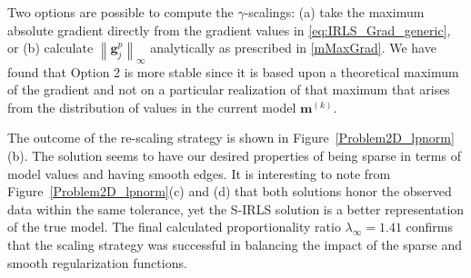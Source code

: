 \documentclass[extra,referee]{gji}
\begin{document}
Two options are possible to compute the $\gamma$-scalings: (a) take the maximum absolute gradient directly from the gradient values in \eqref{eq:IRLS_Grad_generic}, or (b) calculate $\left\|\mathbf{g}_j^p\right\|_\infty$ analytically as prescribed in \eqref{mMaxGrad}. We have found that Option 2 is more stable since it is based upon a theoretical maximum of the gradient and not on a particular realization of that maximum that arises from the distribution of values in the current model $\mathbf{m}^{(k)}$.

The outcome of the re-scaling strategy is shown in Figure~\ref{Problem2D_lpnorm}(b). The solution seems to have our desired properties of being sparse in terms of model values and having smooth edges. It is interesting to note from Figure~\ref{Problem2D_lpnorm}(c) and (d) that both solutions honor the observed data within the same tolerance, yet the S-IRLS solution is a better representation of the true model.
The final calculated proportionality ratio $\lambda_\infty = 1.41$ confirms that the scaling strategy was successful in balancing the impact of the sparse and smooth regularization functions.
\end{document}
